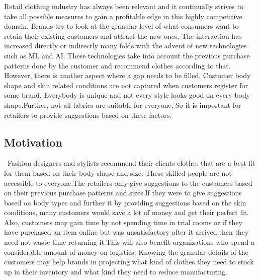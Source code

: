 \documentclass[11pt,journal,compsoc]{IEEEtran}
\begin{document}
\maketitle
{}
Retail clothing industry has always been relevant and it continually strives to take all possible measures to gain a profitable edge in this highly competitive domain. Brands try to look at the granular level of what consumers want to retain their existing customers and attract the new ones. The interaction has increased directly or indirectly many folds with the advent of new technologies such as ML and AI. These technologies take into account the previous purchase patterns done by the customer and recommend clothes according to that. However, there is another aspect where a gap needs to be filled. Customer body shape and skin related conditions are not captured when customers register for some brand. Everybody is unique and not every style looks good on every body shape.Further, not all fabrics are suitable for everyone, So it is important for retailers to provide suggestions based on these factors.

\subsection{Motivation}\
\IEEEPARstart Fashion designers and stylists recommend their clients clothes that are a best fit for them based on their body shape and size. These skilled people are not accessible to everyone.The retailers only give suggestions to the customers based on their previous purchase patterns and sizes.If they were to give suggestions based on body types and further it by providing suggestions based on the skin conditions, many customers would save a lot of money and get their perfect fit. Also, customers may gain time by not spending time in trial rooms or if they have purchased an item online but was unsatisfactory after it arrived,then they need not waste time returning it.This will also benefit organizations who spend a considerable amount of money on logistics. Knowing the granular details of the customers may help brands in projecting what kind of clothes they need to stock up in their inventory and what kind they need to reduce manufacturing.
\end{document}
